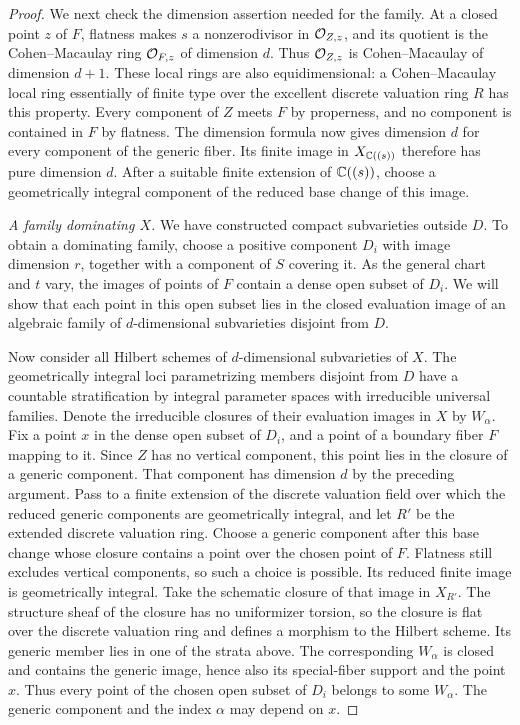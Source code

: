 \begin{proof}
We next check the dimension assertion needed for the family.
At a closed point $z$ of $F$, flatness makes $s$ a
nonzerodivisor in $\mathcal{O}_{Z,z}$, and its quotient is the
Cohen--Macaulay ring $\mathcal{O}_{F,z}$ of dimension $d$.
Thus $\mathcal{O}_{Z,z}$ is Cohen--Macaulay of dimension $d+1$.
These local rings are also equidimensional: a Cohen--Macaulay local ring
essentially of finite type over the excellent discrete
valuation ring $R$ has this property.
Every component of $Z$ meets $F$ by properness, and no
component is contained in $F$ by flatness.  The dimension
formula now gives dimension $d$ for every component of the
generic fiber.  Its finite image in $X_{\mathbb{C}((s))}$ therefore
has pure dimension $d$.  After a suitable finite extension of
$\mathbb{C}((s))$, choose a geometrically integral component of the
reduced base change of this image.

\smallskip\noindent\emph{A family dominating $X$.}
We have constructed compact subvarieties outside $D$.
To obtain a dominating family, choose a positive component
$D_i$ with image dimension $r$, together with a component
of $S$ covering it.  As the general chart and $t$ vary,
the images of points of $F$ contain a dense open subset
of $D_i$.  We will show that each point in this open subset
lies in the closed evaluation image of an algebraic family
of $d$-dimensional subvarieties disjoint from $D$.

Now consider all Hilbert schemes of $d$-dimensional
subvarieties of $X$.  The geometrically integral loci
parametrizing members disjoint from $D$ have a countable
stratification by integral parameter spaces with
irreducible universal families.  Denote the irreducible
closures of their evaluation images in $X$ by $W_\alpha$.
Fix a point $x$ in the dense open subset of $D_i$, and a
point of a boundary fiber $F$ mapping to it.  Since $Z$ has
no vertical component, this point lies in the closure of a
generic component.  That component has dimension $d$ by
the preceding argument.  Pass to a finite extension of the
discrete valuation field over which the reduced generic
components are geometrically integral, and let $R'$ be the
extended discrete valuation ring.  Choose a generic component
after this base change whose closure contains a point over
the chosen point of $F$.  Flatness still excludes vertical
components, so such a choice is possible.  Its reduced
finite image is geometrically integral.  Take the schematic
closure of that image in $X_{R'}$.
The structure sheaf of the closure has no uniformizer
torsion, so the closure is flat over the discrete valuation
ring and defines a morphism to the Hilbert scheme.
Its generic member lies in one of the strata above.
The corresponding $W_\alpha$ is closed and contains the
generic image, hence also its special-fiber support and
the point $x$.  Thus every point of the chosen open subset
of $D_i$ belongs to some $W_\alpha$.  The generic component
and the index $\alpha$ may depend on $x$.


\end{proof}
